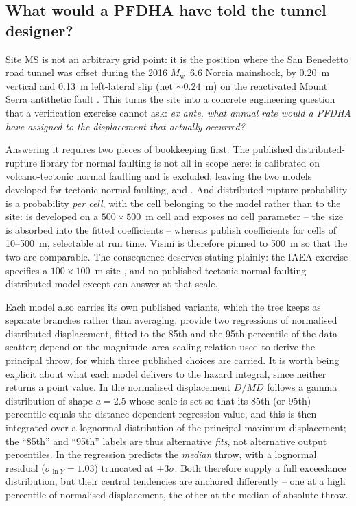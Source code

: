 \subsection{What would a PFDHA have told the tunnel designer?}
\label{sec:application:tunnel}

Site MS is not an arbitrary grid point: it is the position where the
San Benedetto road tunnel was offset during the 2016
$M_{\mathrm{w}}$~6.6 Norcia mainshock, by 0.20~m vertical and 0.13~m
left-lateral slip (net ${\sim}0.24$~m) on the reactivated Mount Serra
antithetic fault \citep{Galli2019WTC, Galli2020}. This turns the site
into a concrete engineering question that a verification exercise
cannot ask: \emph{ex ante, what annual rate would a PFDHA have assigned
to the displacement that actually occurred?}

Answering it requires two pieces of bookkeeping first. The published
distributed-rupture library for normal faulting is not all in scope
here: \citet{FerrarioLivio2021} is calibrated on volcano-tectonic
normal faulting and is excluded, leaving the two models developed for
tectonic normal faulting, \citet{youngs_methodology_2003} and
\citet{Visini2025}. And distributed rupture probability is a
probability \emph{per cell}, with the cell belonging to the model
rather than to the site:
\citet{youngs_methodology_2003} is developed on a $500 \times 500$~m
cell and exposes no cell parameter -- the size is absorbed into the
fitted coefficients -- whereas \citet{Visini2025} publish coefficients
for cells of 10--500~m, selectable at run time. Visini is therefore
pinned to 500~m so that the two are comparable. The consequence
deserves stating plainly: the IAEA exercise specifies a
$100 \times 100$~m site \citep[Table~13]{IAEA2025TECDOC2092}, and no
published tectonic normal-faulting distributed model except
\citet{Visini2025} can answer at that scale.

Each model also carries its own published variants, which the tree
keeps as separate branches rather than averaging.
\citet{youngs_methodology_2003} provide two regressions of normalised
distributed displacement, fitted to the 85th and the 95th percentile of
the data scatter; \citet{Visini2025} depend on the
magnitude--area scaling relation used to derive the principal throw,
for which three published choices are carried. It is worth being
explicit about what each model delivers to the hazard integral, since
neither returns a point value. In \citet{youngs_methodology_2003} the
normalised displacement $D/MD$ follows a gamma distribution of shape
$a = 2.5$ whose scale is set so that its 85th (or 95th) percentile
equals the distance-dependent regression value, and this is then
integrated over a \citet{WellsCoppersmith1994} lognormal distribution
of the principal maximum displacement; the ``85th'' and ``95th'' labels
are thus alternative \emph{fits}, not alternative output percentiles.
In \citet{Visini2025} the regression predicts the \emph{median} throw,
with a lognormal residual ($\sigma_{\ln Y} = 1.03$) truncated at
$\pm 3\sigma$. Both therefore supply a full exceedance distribution,
but their central tendencies are anchored differently -- one at a high
percentile of normalised displacement, the other at the median of
absolute throw.

